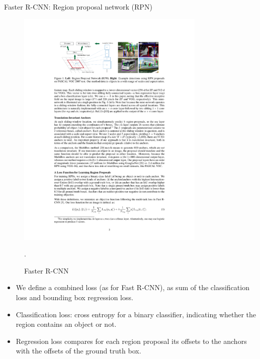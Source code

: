 \documentclass[xcolor=pdftex,dvipsnames,table]{beamer}
\begin{document}

\begin{frame}{Faster R-CNN: Region proposal network (RPN)}
\begin{figure}[htb]
   \centering
   \includegraphics[width=0.8\textwidth]{../graphics/Faster_R-CNN.pdf}
   \caption{Faster R-CNN \cite{Ren2017}}.
\end{figure}
\begin{itemize}
\item We define a combined loss (as for Fast R-CNN), as sum of the classification loss and bounding box regression loss.
\item Classification loss: cross entropy for a binary classifier, indicating whether the region contains an object or not.
\item Regression loss compares for each region proposal its offsets to the anchors with the offsets of the ground truth box.
\end{itemize}
\end{frame}
\end{document}
